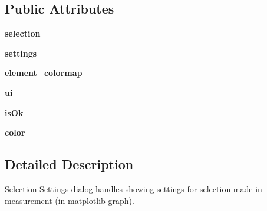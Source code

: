 \subsection*{Public Attributes}
\begin{DoxyCompactItemize}
\item 
\hypertarget{classDialogs_1_1SelectionDialog_1_1SelectionSettingsDialog_aca90625a206f72c6cf9c4d64c8f4ac29}{{\bfseries selection}}\label{classDialogs_1_1SelectionDialog_1_1SelectionSettingsDialog_aca90625a206f72c6cf9c4d64c8f4ac29}

\item 
\hypertarget{classDialogs_1_1SelectionDialog_1_1SelectionSettingsDialog_a4387c416279f64c1b13290fc3d92f845}{{\bfseries settings}}\label{classDialogs_1_1SelectionDialog_1_1SelectionSettingsDialog_a4387c416279f64c1b13290fc3d92f845}

\item 
\hypertarget{classDialogs_1_1SelectionDialog_1_1SelectionSettingsDialog_a97c3f3c37e91924b6fa7cfe7c1b7d731}{{\bfseries element\-\_\-colormap}}\label{classDialogs_1_1SelectionDialog_1_1SelectionSettingsDialog_a97c3f3c37e91924b6fa7cfe7c1b7d731}

\item 
\hypertarget{classDialogs_1_1SelectionDialog_1_1SelectionSettingsDialog_a8a57a64137f5a2c41b3e7399c43b239f}{{\bfseries ui}}\label{classDialogs_1_1SelectionDialog_1_1SelectionSettingsDialog_a8a57a64137f5a2c41b3e7399c43b239f}

\item 
\hypertarget{classDialogs_1_1SelectionDialog_1_1SelectionSettingsDialog_a74b880557e46d672aaab2b722f48e37a}{{\bfseries is\-Ok}}\label{classDialogs_1_1SelectionDialog_1_1SelectionSettingsDialog_a74b880557e46d672aaab2b722f48e37a}

\item 
\hypertarget{classDialogs_1_1SelectionDialog_1_1SelectionSettingsDialog_a241ec2cb90771555d113d12c7b65023c}{{\bfseries color}}\label{classDialogs_1_1SelectionDialog_1_1SelectionSettingsDialog_a241ec2cb90771555d113d12c7b65023c}

\end{DoxyCompactItemize}


\subsection{Detailed Description}
\begin{DoxyVerb}Selection Settings dialog handles showing settings for selection made in 
measurement (in matplotlib graph).
\end{DoxyVerb}
 

